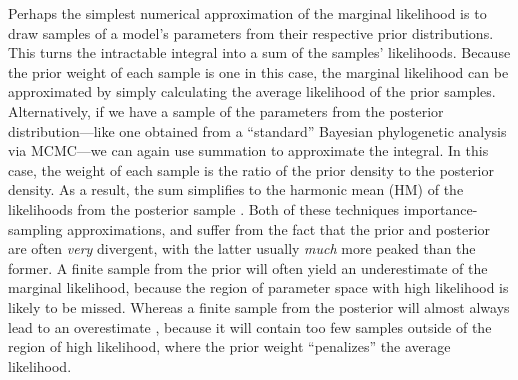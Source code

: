 Perhaps the simplest numerical approximation of the marginal likelihood is to
draw samples of a model's parameters from their respective prior distributions.
This turns the intractable integral into a sum of the samples' likelihoods.
Because the prior weight of each sample is one in this case, the marginal
likelihood can be approximated by simply calculating the average likelihood of
the prior samples.
Alternatively, if we have a sample of the parameters from the posterior
distribution---like one obtained from a ``standard'' Bayesian phylogenetic
analysis via MCMC---we can again use summation to approximate the integral.
In this case, the weight of each sample is the ratio of the prior density to
the posterior density.
As a result, the sum simplifies to the harmonic mean (HM) of the likelihoods
from the posterior sample \citep{Newton1994}.
Both of these techniques   importance-sampling  approximations, and suffer
from the fact that the prior and posterior are often \emph{very} divergent,
with the latter usually \emph{much} more peaked than the former.
A finite sample from the prior will often yield an underestimate of the
marginal likelihood, because the region of parameter space with high likelihood
is likely to be missed.
Whereas a finite sample from the posterior will almost always lead to an
overestimate \citep{Lartillot2006,Xie2011,Fan2011}, because it will contain too
few samples outside of the region of high likelihood, where the prior weight
``penalizes'' the average likelihood.

